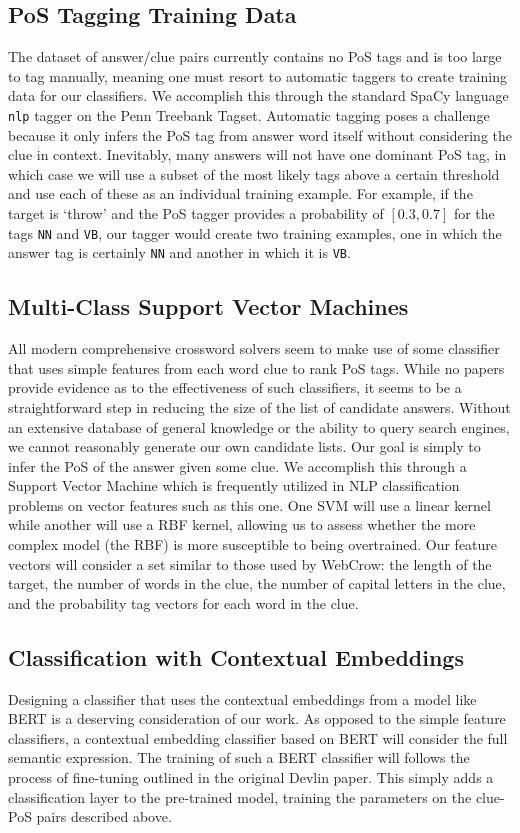 \documentclass[11pt,a4paper]{article}
\begin{document}
\subsection{PoS Tagging Training Data}
The dataset of answer/clue pairs currently contains no PoS tags and is too large to tag manually, meaning one must resort to automatic taggers to create training data for our classifiers. We accomplish this through the standard SpaCy language \texttt{nlp} tagger on the Penn Treebank Tagset. Automatic tagging poses a challenge because it only infers the PoS tag from answer word itself without considering the clue in context. Inevitably, many answers will not have one dominant PoS tag, in which case we will use a subset of the most likely tags above a certain threshold and use each of these as an individual training example. For example, if the target is `throw' and the PoS tagger provides a probability of $[0.3, 0.7]$ for the tags \texttt{NN} and \texttt{VB}, our tagger would create two training examples, one in which the answer tag is certainly \texttt{NN} and another in which it is \texttt{VB}. %

\subsection{Multi-Class Support Vector Machines}
All modern comprehensive crossword solvers seem to make use of some classifier that uses simple features from each word clue to rank PoS tags. While no papers provide evidence as to the effectiveness of such classifiers, it seems to be a straightforward step in reducing the size of the list of candidate answers. Without an extensive database of general knowledge or the ability to query search engines, we cannot reasonably generate our own candidate lists. Our goal is simply to infer the PoS of the answer given some clue. We accomplish this through a Support Vector Machine which is frequently utilized in NLP classification problems on vector features such as this one. One SVM will use a linear kernel while another will use a RBF kernel, allowing us to assess whether the more complex model (the RBF) is more susceptible to being overtrained. Our feature vectors will consider a set similar to those used by WebCrow: the length of the target, the number of words in the clue, the number of capital letters in the clue, and the probability tag vectors for each word in the clue.

\subsection{Classification with Contextual Embeddings}
Designing a classifier that uses the contextual embeddings from a model like BERT \cite{Devlin-BERT} is a deserving consideration of our work. As opposed to the simple feature classifiers, a contextual embedding classifier based on BERT will consider the full semantic expression. The training of such a BERT classifier will follows the process of fine-tuning outlined in the original Devlin paper. This simply adds a classification layer to the pre-trained model, training the parameters on the clue-PoS pairs described above.



\end{document}
